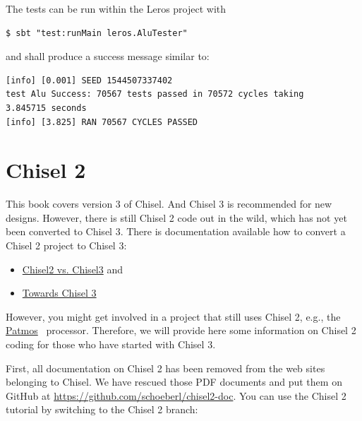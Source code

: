 \documentclass[%
    10pt, %
    headinclude, footexclude,
    openright, %
    notitlepage,
    cleardoubleempty,
    headsepline,
    pointlessnumbers,
    bibtotoc, idxtotoc,
    ]{scrbook}
\newcommand{\myref}[2]{\href{#1}{#2}}
\begin{document}


\noindent The tests can be run within the Leros project with

\begin{verbatim}
$ sbt "test:runMain leros.AluTester"
\end{verbatim}

and shall produce a success message similar to:

\begin{verbatim}
[info] [0.001] SEED 1544507337402
test Alu Success: 70567 tests passed in 70572 cycles taking
3.845715 seconds
[info] [3.825] RAN 70567 CYCLES PASSED
\end{verbatim}


\chapter{Chisel 2}

This book covers version 3 of Chisel. And Chisel 3 is recommended for new designs.
However, there is still Chisel 2 code out in the wild, which has not yet been converted
to Chisel 3. There is documentation available how to convert a Chisel 2 project to
Chisel 3:

\begin{itemize}
\item \myref{https://github.com/freechipsproject/chisel3/wiki/Chisel3-vs-Chisel2}{Chisel2 vs. Chisel3} and
\item \myref{https://github.com/schoeberl/chisel-examples/blob/master/TowardsChisel3.md}{Towards Chisel 3}
\end{itemize}

However, you might get involved in a project that still uses Chisel 2,
e.g., the \myref{https://github.com/t-crest/patmos}{Patmos}~\cite{patmos:rts2018} processor.
Therefore, we will provide here some information on Chisel 2 coding for those who
have started with Chisel 3.

First, all documentation on Chisel 2 has been removed from the web sites
belonging to Chisel. We have rescued those PDF documents and put them
on GitHub at \url{https://github.com/schoeberl/chisel2-doc}.
You can use the Chisel 2 tutorial by switching to the Chisel 2 branch:

\end{document}
